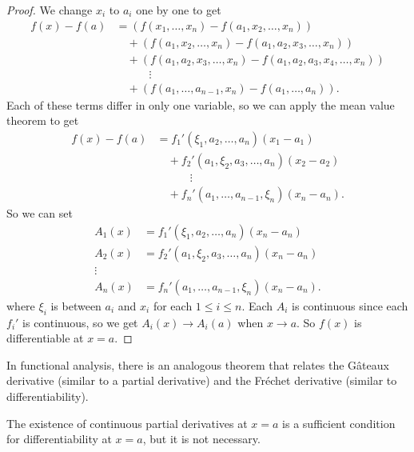 \begin{proof}
  We change $x_i$ to $a_i$ one by one to get
  \begin{align*}
    f(x) - f(a)
    &= (f(x_1, \dots, x_n) - f(a_1, x_2, \dots, x_n)) \\
    &\quad + (f(a_1, x_2, \dots, x_n) - f(a_1, a_2, x_3, \dots, x_n)) \\
    & \quad + (f(a_1, a_2, x_3, \dots, x_n) - f(a_1, a_2, a_3, x_4, \dots, x_n)) \\
    & \quad \quad \quad \vdots \\
    &\quad + (f(a_1, \dots, a_{n-1}, x_n) - f(a_1, \dots, a_n)).
  \end{align*}
  Each of these terms differ in only one variable, so
  we can apply the mean value theorem to get
  \begin{align*}
    f(x) - f(a)
    &= f_1'(\xi_1, a_2, \dots, a_n)(x_1 - a_1) \\
    &\quad + f_2'(a_1, \xi_2, a_3, \dots, a_n)(x_2 - a_2) \\
    & \quad \quad \quad \vdots \\
    &\quad + f_n'(a_1, \dots, a_{n-1}, \xi_n)(x_n - a_n).
  \end{align*}
  So we can set
  \begin{align*}
    A_1(x) &= f_1'(\xi_1, a_2, \dots, a_n) (x_n - a_n) \\
    A_2(x) &= f_2'(a_1, \xi_2, a_3, \dots, a_n) (x_n - a_n) \\
    \vdots \\
    A_n(x) &= f_n'(a_1, \dots, a_{n-1}, \xi_n) (x_n - a_n).
  \end{align*}
  where $\xi_i$ is between $a_i$ and $x_i$ for each
  $1 \le i \le n$. Each $A_i$ is continuous since
  each $f_i'$ is continuous, so we get $A_i(x) \to A_i(a)$
  when $x \to a$. So $f(x)$ is differentiable at $x = a$.
\end{proof}

\begin{remark}
  In functional analysis, there is an analogous theorem
  that relates the G\^ateaux derivative (similar to
  a partial derivative) and the Fr\'echet derivative
  (similar to differentiability).
\end{remark}

\begin{remark}
  The existence of continuous partial derivatives at
  $x = a$ is
  a sufficient condition for differentiability at
  $x = a$, but it is not necessary.
\end{remark}

